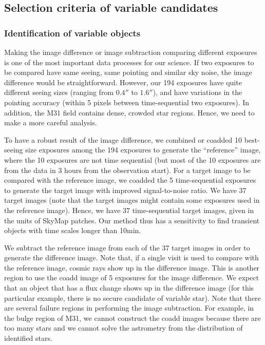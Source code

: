 \documentclass[iop, apj]{emulateapj}
\newcommand{\?}{\stackrel{?}{=}}
\begin{document}
\subsection{Selection criteria of variable candidates}
\label{sec:detecmethod}
\subsubsection{Identification of variable objects}
Making the image difference or image subtraction comparing different exposures is one of the most important data processes for our science. If two exposures to be compared have same seeing, same pointing and similar sky noise, the image difference would be straightforward. However, our 194 exposures have quite different seeing sizes (ranging from $0.4''$ to $1.6''$), and have variations in the pointing accuracy (within 5 pixels between time-sequential two exposures). In addition, the M31 field contains dense, crowded star regions. Hence, we need to make a more careful analysis. 

To have a robust result of the image difference, we combined or coadded 10 best-seeing size exposures among the 194 exposures to generate the ``reference'' image, where the 10 exposures are not time sequential (but most of the 10 exposures are from the data in 3 hours from the observation start). 
For a target image to be compared with the reference image, we coadded the 5 time-sequential exposures to generate the target image with improved signal-to-noise ratio. We have 37 target images (note that the target images might contain some exposures used in the reference image). Hence, we have $37$ time-sequential target images, given in the units of SkyMap patches. Our method thus has a sensitivity to find transient objects with time scales longer than 10min. 

We subtract the reference image from each of the 37 target images in order to generate the difference image. 
Note that, if a single visit is used to compare with the reference image, cosmic rays show up in the difference image. This is another region to use the coadd image of 5 exposures for the image difference. We expect that an object that has a flux change shows up in the difference image (for this particular example, there is no secure candidate of variable star). 
Note that there are several failure regions in performing the image subtraction. For example, in the bulge region of M31, we cannot construct the coadd images because there are too many stars and we cannot solve the astrometry from the distribution of identified stars.  
\end{document}
